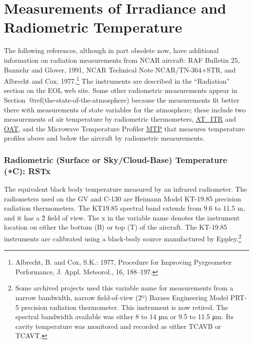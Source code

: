 \documentclass[
  english,
]{book}
\begin{document}
\hypertarget{measurements-of-irradiance-and-radiometric-temperature}{%
\section{Measurements of Irradiance and Radiometric
Temperature}\label{measurements-of-irradiance-and-radiometric-temperature}}

The following references, although in part obsolete now, have additional
information on radiation measurements from NCAR aircraft: RAF Bulletin
25, Bannehr and Glover, 1991, NCAR Technical Note NCAR/TN-364+STR, and
Albrecht and Cox, 1977.\footnote{Albrecht, B. and Cox, S.K.: 1977,
  Procedure for Improving Pyrgeometer Performance, J. Appl. Meteorol.,
  16, 188--197.} The instruments are described in the ``Radiation''
section on the EOL web site. Some other radiometric measurements appear
in Section~@ref(the-state-of-the-atmosphere) because the measurements
fit better there with measurements of state variables for the
atmosphere; these include two measurements of air temperature by
radiometric thermometers, \protect\hyperlink{AT_ITR}{AT\_ITR} and
\protect\hyperlink{OAT}{OAT}, and the Microwave Temperature Profiler
\href{http://www.eol.ucar.edu/instruments/microwave-temperature-profiler}{MTP}
that measures temperature profiles above and below the aircraft by
radiometric measurements.

\hypertarget{rstx}{%
\subsubsection*{\texorpdfstring{Radiometric (Surface or Sky/Cloud-Base)
Temperature ({∘C}):
RSTx}{Radiometric (Surface or Sky/Cloud-Base) Temperature (∘C): RSTx}}\label{rstx}}

The equivalent black body temperature measured by an infrared
radiometer. The radiometers used on the GV and C-130 are Heimann Model
KT-19.85 precision radiation thermometers. The KT19.85 spectral band
extends from 9.6 to 11.5 m, and it has a 2̊ field of view. The x in the
variable name denotes the instrument location on either the bottom (B)
or top (T) of the aircraft. The KT-19.85 instruments are calibrated
using a black-body source manufactured by Eppley.\footnote{Some archived
  projects used this variable name for measurements from a narrow
  bandwidth, narrow field-of-view (2{º}) Barnes Engineering Model PRT-5
  precision radiation thermometer. This instrument is now retired. The
  spectral bandwidth available was either 8 to 14 {μm} or 9.5 to 11.5
  {μm}. Its cavity temperature was monitored and recorded as either
  TCAVB or TCAVT.}
\end{document}
